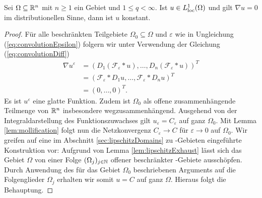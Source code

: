 \begin{lem}
\label{lem:nablauconstant}
  Sei $\Omega \subseteq \mathbb{R}^n$ mit $n \geq 1$ ein Gebiet und $1 \leq q < \infty$.
  Ist $u \in L^1_{\operatorname{loc}}(\Omega)$ und gilt $\nabla u = 0$ im distributionellen Sinne, dann ist $u$ konstant.
\end{lem}

\begin{proof}
  Für alle beschränkten Teilgebiete $\Omega_0 \subseteq \Omega$ und $\varepsilon$ wie in Ungleichung (\ref{eq:convolutionEpsilon}) folgern wir unter Verwendung der Gleichung (\ref{eq:convolutionDiff})
  \begin{align*}
    \nabla u^\varepsilon
    &= (D_1 (\mathcal{F}_\varepsilon \ast u), \dots, D_n (\mathcal{F}_\varepsilon \ast u))^T \\
    &= ( \mathcal{F}_\varepsilon \ast D_1 u, \dots, \mathcal{F}_\varepsilon \ast D_n u)^T \\
    &= (0, \dots, 0)^T.
  \end{align*}
  Es ist $u^\varepsilon$ eine glatte Funktion.
  Zudem ist $\Omega_0$ als offene zusammenhängende Teilmenge von $\mathbb{R}^n$ insbesondere wegzusammenhängend.
  Ausgehend von der Integraldarstellung des Funktionszuwachses \cite[S.57, (11)]{koenigsberger2004ana2} gilt $u_\varepsilon = C_\varepsilon$ auf ganz $\Omega_0$.
  Mit Lemma \ref{lem:mollification} folgt nun die Netzkonvergenz $C_\varepsilon \to C$ für $\varepsilon \to 0$ auf $\Omega_0$.
  Wir greifen auf eine im Abschnitt \ref{sec:lipschitzDomains} zu \lipschitz\hyp{}Gebieten eingeführte Konstruktion vor:
  Aufgrund von Lemma \ref{lem:lipschitzExhaust} lässt sich das Gebiet $\Omega$ von einer Folge $(\Omega_j)_{j \in \mathbb{N}}$ offener beschränkter \lipschitz\hyp{}Gebiete ausschöpfen. 
  Durch Anwendung des für das Gebiet $\Omega_0$ beschriebenen Arguments auf die Folgenglieder $\Omega_j$ erhalten wir somit $u = C$ auf ganz $\Omega$. 
  Hieraus folgt die Behauptung.
\end{proof}


